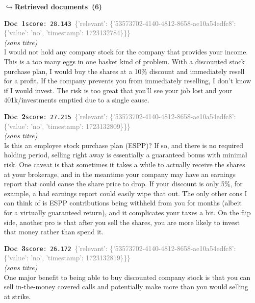 \documentclass[a4paper,11pt]{article}
\begin{document}
\noindent\hfill{\footnotesize\textcolor{doccolor}{\textbf{$\hookrightarrow$\enspace Retrieved documents~(6)}}}
\begin{docenv}
{\footnotesize\textcolor{doccolor}{\textbf{Doc~1}}}\hfill{\tiny\texttt{score:~28.143}}\ {\tiny\textcolor{gray}{\{'relevant': \{'53573702-4140-4812-8658-ae10a54edfc8': \{'value': 'no', 'timestamp': 1723132784\}\}\}}}\\[3pt]
{\small\textit{(sans titre)}}\\[2pt]
\vspace{2pt}
{\footnotesize 
I would not hold any company stock for the company that provides your income.   This is a too many eggs in one basket kind of problem. With a discounted stock purchase plan, I would buy the shares at a 10\% discount and immediately resell for a profit.   If the company prevents you from immediately reselling, I  don't know if I would invest. The risk is too great that you'll see your job lost and your 401k/investments emptied due to a single cause.}
\end{docenv}
\begin{docenv}
{\footnotesize\textcolor{doccolor}{\textbf{Doc~2}}}\hfill{\tiny\texttt{score:~27.215}}\ {\tiny\textcolor{gray}{\{'relevant': \{'53573702-4140-4812-8658-ae10a54edfc8': \{'value': 'no', 'timestamp': 1723132809\}\}\}}}\\[3pt]
{\small\textit{(sans titre)}}\\[2pt]
\vspace{2pt}
{\footnotesize 
Is this an employee stock purchase plan (ESPP)? If so, and there is no required holding period, selling right away is essentially a guaranteed bonus with minimal risk. One caveat is that sometimes it takes a while to actually receive the shares at your brokerage, and in the meantime your company may have an earnings report that could cause the share price to drop. If your discount is only 5\%, for example, a bad earnings report could easily wipe that out. The only other cons I can think of is ESPP contributions being withheld from you for months (albeit for a virtually guaranteed return), and it complicates your taxes a bit. On the flip side, another pro is that after you sell the shares, you are more likely to invest that money rather than spend it.}
\end{docenv}
\begin{docenv}
{\footnotesize\textcolor{doccolor}{\textbf{Doc~3}}}\hfill{\tiny\texttt{score:~26.172}}\ {\tiny\textcolor{gray}{\{'relevant': \{'53573702-4140-4812-8658-ae10a54edfc8': \{'value': 'no', 'timestamp': 1723132819\}\}\}}}\\[3pt]
{\small\textit{(sans titre)}}\\[2pt]
\vspace{2pt}
{\footnotesize 
One major benefit to being able to buy discounted company stock is that you can sell in-the-money covered calls and potentially make more than you would selling at strike.}
\end{docenv}
\end{document}
